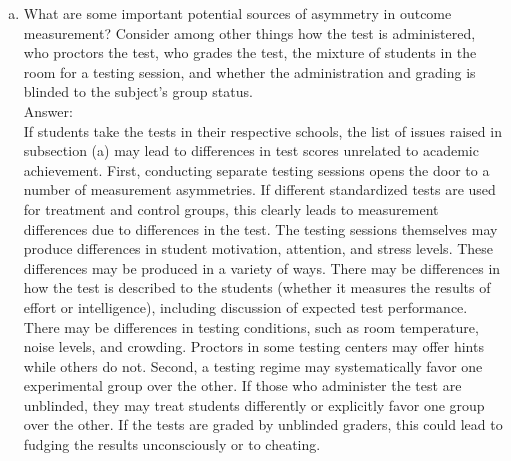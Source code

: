 \documentclass[11pt,notitlepage]{article}\usepackage[]{graphicx}\usepackage[]{color}
\begin{document}
\begin{enumerate}[a)]
\item What are some important potential sources of asymmetry in outcome measurement? Consider among other things how the test is administered, who proctors the test, who grades the test, the mixture of students in the room for a testing session, and whether the administration and grading is blinded to the subject's group status.\\
Answer:\\
If students take the tests in their respective schools, the list of issues raised in subsection (a) may lead to differences in test scores unrelated to academic achievement. 
First, conducting separate testing sessions opens the door to a number of measurement asymmetries. If different standardized tests are used for treatment and control groups, this clearly leads to measurement differences due to differences in the test. The testing sessions themselves may produce differences in student motivation, attention, and stress levels. These differences may be produced in a variety of ways. There may be differences in how the test is described to the students (whether it measures the results of effort or intelligence), including discussion of expected test performance. There may be differences in testing conditions, such as room temperature, noise levels, and crowding. Proctors in some testing centers may offer hints while others do not.  
Second, a testing regime may systematically favor one experimental group over the other. If those who administer the test are unblinded, they may treat students differently or explicitly favor one group over the other. If the tests are graded by unblinded graders, this could lead to fudging the results unconsciously or to cheating. 


\end{enumerate}
\end{document}
